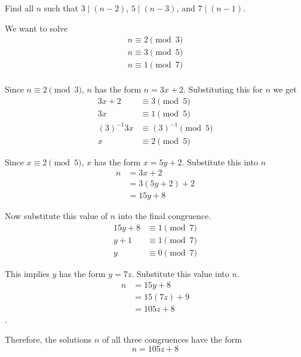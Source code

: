 
Find all $n$ such that $3 \mid (n-2)$, $5 \mid (n-3)$, and $7 \mid (n-1)$. 


We want to solve 
\begin{align*}
    n \equiv 2 \pmod{3} \\
    n \equiv 3 \pmod{5} \\
    n \equiv 1 \pmod{7} \\
\end{align*}

Since $n \equiv 2 \pmod{3}$, $n$ has the form $n = 3x + 2$. Substituting
this for $n$ we get
\begin{align*}
    3x + 2 &\equiv 3 \pmod{5} \\
    3x &\equiv 1 \pmod{5} \\
    (3)^{-1}3x &\equiv (3)^{-1} \pmod{5} \\
    x &\equiv 2 \pmod{5}
\end{align*}

Since $x \equiv 2 \pmod{5}$, $x$ has the form $x = 5y + 2$. Substitute this
into $n$
\begin{align*}
    n &= 3x + 2 \\
      &= 3(5y + 2) + 2 \\
      &= 15y + 8
\end{align*}

Now substitute this value of $n$ into the final congruence.
\begin{align*}
    15y + 8 &\equiv 1 \pmod{7} \\
    y + 1   &\equiv 1 \pmod{7} \\
    y &\equiv 0 \pmod{7}
\end{align*}

This implies $y$ has the form $y = 7z$. Substitute this value into $n$.
\begin{align*}
    n &= 15y + 8 \\
      &= 15(7z) + 9 \\
      &= 105z + 8 
\end{align*}.

Therefore, the solutions $n$ of all three congruences have the form 
\[n = 105z + 8\]
